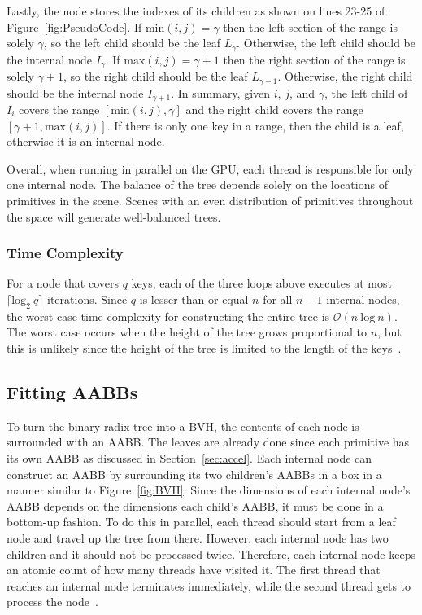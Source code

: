 \documentclass{sig-alternate}
\newcommand{\ceil}[1]{\lceil #1 \rceil}
\begin{document}
Lastly, the node stores the indexes of its children as shown on lines 23-25 of Figure~\ref{fig:PseudoCode}. If $\textrm{min}(i,j)=\gamma$ then the left section of the range is solely $\gamma$, so the left child should be the leaf $L_{\gamma}$. Otherwise, the left child should be the internal node $I_{\gamma}$. If $\textrm{max}(i,j)=\gamma+1$ then the right section of the range is solely $\gamma+1$, so the right child should be the leaf $L_{\gamma+1}$. Otherwise, the right child should be the internal node $I_{\gamma+1}$. In summary, given $i$, $j$, and $\gamma$, the left child of $I_i$ covers the range $[\textrm{min}(i,j), \gamma]$ and the right child covers the range $[\gamma+1,\textrm{max}(i,j)]$. If there is only one key in a range, then the child is a leaf, otherwise it is an internal node.

Overall, when running in parallel on the GPU, each thread is responsible for only one internal node. The balance of the tree depends solely on the locations of primitives in the scene. Scenes with an even distribution of primitives throughout the space will generate well-balanced trees.

\subsubsection{Time Complexity}
\label{sec:time}

For a node that covers $q$ keys, each of the three loops above executes at most $\ceil{\textrm{log}_{2}~q}$ iterations. Since $q$ is lesser than or equal $n$ for all $n-1$ internal nodes, the worst-case time complexity for constructing the entire tree is $\mathcal{O}(n~\textrm{log}~n)$. The worst case occurs when the height of the tree grows proportional to $n$, but this is unlikely since the height of the tree is limited to the length of the keys~\cite{Karras:2012}.

\subsection{Fitting AABBs}
\label{sec:fitting}

To turn the binary radix tree into a BVH, the contents of each node is surrounded with an AABB. The leaves are already done since each primitive has its own AABB as discussed in Section~\ref{sec:accel}. Each internal node can construct an AABB by surrounding its two children's AABBs in a box in a manner similar to Figure~\ref{fig:BVH}. Since the dimensions of each internal node's AABB depends on the dimensions each child's AABB, it must be done in a bottom-up fashion. To do this in parallel, each thread should start from a leaf node and travel up the tree from there. However, each internal node has two children and it should not be processed twice. Therefore, each internal node keeps an atomic count of how many threads have visited it. The first thread that reaches an internal node terminates immediately, while the second thread gets to process the node~\cite{Karras:2012}.
\end{document}
